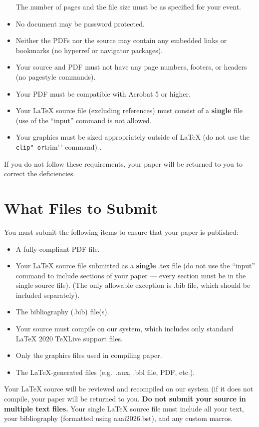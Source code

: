 \documentclass[letterpaper]{article} %
\begin{document}
\begin{itemize}
  The number of pages and the file size must be as specified for your
  event.
\item
  No document may be password protected.
\item
  Neither the PDFs nor the source may contain any embedded links or
  bookmarks (no hyperref or navigator packages).
\item
  Your source and PDF must not have any page numbers, footers, or
  headers (no pagestyle commands).
\item
  Your PDF must be compatible with Acrobat 5 or higher.
\item
  Your {\LaTeX} source file (excluding references) must consist of a
  \textbf{single} file (use of the ``input'' command is not allowed.
\item
  Your graphics must be sized appropriately outside of {\LaTeX} (do not
  use the \texttt{clip"\ or}trim'\,' command) .
\end{itemize}

If you do not follow these requirements, your paper will be returned to
you to correct the deficiencies.

\section{What Files to Submit}\label{what-files-to-submit}

You must submit the following items to ensure that your paper is
published:

\begin{itemize}
\tightlist
\item
  A fully-compliant PDF file.
\item
  Your {\LaTeX} source file submitted as a \textbf{single} .tex file (do
  not use the ``input'' command to include sections of your paper ---
  every section must be in the single source file). (The only allowable
  exception is .bib file, which should be included separately).
\item
  The bibliography (.bib) file(s).
\item
  Your source must compile on our system, which includes only standard
  {\LaTeX} 2020 TeXLive support files.
\item
  Only the graphics files used in compiling paper.
\item
  The {\LaTeX}-generated files (e.g.~.aux, .bbl file, PDF, etc.).
\end{itemize}

Your {\LaTeX} source will be reviewed and recompiled on our system (if
it does not compile, your paper will be returned to you. \textbf{Do not
submit your source in multiple text files.} Your single {\LaTeX} source
file must include all your text, your bibliography (formatted using
aaai2026.bst), and any custom macros.
\end{document}
